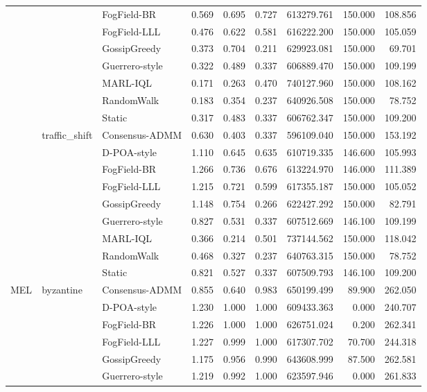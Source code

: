 \begin{table}
\begin{tabular}{lllrrrrrr}
 &  & FogField-BR & 0.569 & 0.695 & 0.727 & 613279.761 & 150.000 & 108.856 \\
 &  & FogField-LLL & 0.476 & 0.622 & 0.581 & 616222.200 & 150.000 & 105.059 \\
 &  & GossipGreedy & 0.373 & 0.704 & 0.211 & 629923.081 & 150.000 & 69.701 \\
 &  & Guerrero-style & 0.322 & 0.489 & 0.337 & 606889.470 & 150.000 & 109.199 \\
 &  & MARL-IQL & 0.171 & 0.263 & 0.470 & 740127.960 & 150.000 & 108.162 \\
 &  & RandomWalk & 0.183 & 0.354 & 0.237 & 640926.508 & 150.000 & 78.752 \\
 &  & Static & 0.317 & 0.483 & 0.337 & 606762.347 & 150.000 & 109.200 \\
\cline{2-9}
 & \multirow[t]{9}{*}{traffic\_shift} & Consensus-ADMM & 0.630 & 0.403 & 0.337 & 596109.040 & 150.000 & 153.192 \\
 &  & D-POA-style & 1.110 & 0.645 & 0.635 & 610719.335 & 146.600 & 105.993 \\
 &  & FogField-BR & 1.266 & 0.736 & 0.676 & 613224.970 & 146.000 & 111.389 \\
 &  & FogField-LLL & 1.215 & 0.721 & 0.599 & 617355.187 & 150.000 & 105.052 \\
 &  & GossipGreedy & 1.148 & 0.754 & 0.266 & 622427.292 & 150.000 & 82.791 \\
 &  & Guerrero-style & 0.827 & 0.531 & 0.337 & 607512.669 & 146.100 & 109.199 \\
 &  & MARL-IQL & 0.366 & 0.214 & 0.501 & 737144.562 & 150.000 & 118.042 \\
 &  & RandomWalk & 0.468 & 0.327 & 0.237 & 640763.315 & 150.000 & 78.752 \\
 &  & Static & 0.821 & 0.527 & 0.337 & 607509.793 & 146.100 & 109.200 \\
\cline{1-9} \cline{2-9}
\multirow[t]{99}{*}{MEL} & \multirow[t]{9}{*}{byzantine} & Consensus-ADMM & 0.855 & 0.640 & 0.983 & 650199.499 & 89.900 & 262.050 \\
 &  & D-POA-style & 1.230 & 1.000 & 1.000 & 609433.363 & 0.000 & 240.707 \\
 &  & FogField-BR & 1.226 & 1.000 & 1.000 & 626751.024 & 0.200 & 262.341 \\
 &  & FogField-LLL & 1.227 & 0.999 & 1.000 & 617307.702 & 70.700 & 244.318 \\
 &  & GossipGreedy & 1.175 & 0.956 & 0.990 & 643608.999 & 87.500 & 262.581 \\
 &  & Guerrero-style & 1.219 & 0.992 & 1.000 & 623597.946 & 0.000 & 261.833 \\

\end{tabular}
\end{table}
